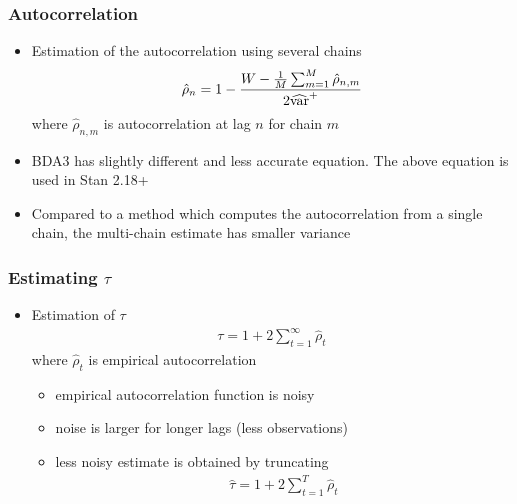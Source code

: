 \documentclass[10pt]{beamer}
\begin{document}
\begin{frame}

\frametitle{Autocorrelation}

  \begin{itemize}
  \item Estimation of the autocorrelation using several chains
    \begin{equation*}
      \hat{\rho}_n=1-\frac{W - \frac{1}{M}\sum_{m=1}^M \hat{\rho}_{n,m}}{2\widehat{\mathrm{var}}^{+}}
    \end{equation*}
    where $\hat{\rho}_{n,m}$ is autocorrelation at lag $n$ for chain $m$
  \item<2-> BDA3 has slightly different and less accurate equation. The
    above equation is used in Stan 2.18+
  \item<3-> Compared to a method which computes the autocorrelation
    from a single chain, the multi-chain estimate has smaller variance
 \end{itemize}
\end{frame}



\begin{frame}

\frametitle{Estimating $\tau$}

  \begin{itemize}
  \item Estimation of $\tau$
    \begin{align*}
      \tau = 1 + 2 \sum_{t=1}^\infty \hat{\rho}_t
    \end{align*}
    where $\hat{\rho}_t$ is empirical autocorrelation
    \begin{itemize}
    \item<2-> empirical autocorrelation function is noisy %
    \item<2-> noise is larger for longer lags (less observations)
    \item<3-> less noisy estimate is obtained by truncating
    \begin{align*}
      \hat{\tau} = 1 + 2 \sum_{t=1}^T \hat{\rho}_t
    \end{align*}
    \end{itemize}
%
    \end{itemize}
\end{frame}
\end{document}
